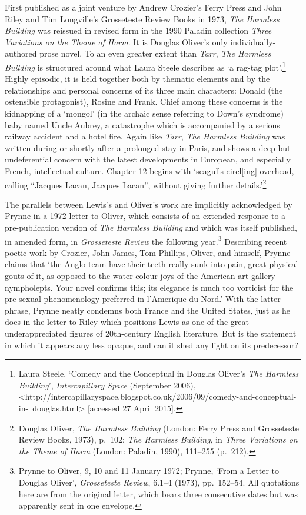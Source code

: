 \documentclass[]{article}
\begin{document}
First published as a joint venture by Andrew Crozier's Ferry Press and
John Riley and Tim Longville's Grosseteste Review Books in 1973,
\emph{The Harmless Building} was reissued in revised form in the 1990
Paladin collection \emph{Three Variations on the Theme of Harm}. It is
Douglas Oliver's only individually-authored prose novel. To an even
greater extent than \emph{Tarr}, \emph{The Harmless Building} is
structured around what Laura Steele describes as `a rag-tag
plot'.\footnote{Laura Steele, `Comedy and the Conceptual in Douglas
  Oliver's \emph{The Harmless Building}', \emph{Intercapillary Space}
  (September 2006),
  \textless{}http://intercapillaryspace.blogspot.co.uk/2006/09/comedy-and-conceptual-in-~douglas.html\textgreater{}
  {[}accessed 27 April 2015{]}.} Highly episodic, it is held together
both by thematic elements and by the relationships and personal concerns
of its three main characters: Donald (the ostensible protagonist),
Rosine and Frank. Chief among these concerns is the kidnapping of a
`mongol' (in the archaic sense referring to Down's syndrome) baby named
Uncle Aubrey, a catastrophe which is accompanied by a serious railway
accident and a hotel fire. Again like \emph{Tarr}, \emph{The Harmless
Building} was written during or shortly after a prolonged stay in Paris,
and shows a deep but undeferential concern with the latest developments
in European, and especially French, intellectual culture. Chapter 12
begins with `seagulls circl{[}ing{]} overhead, calling ``Jacques Lacan,
Jacques Lacan'', without giving further details.'\footnote{Douglas
  Oliver, \emph{The Harmless Building} (London: Ferry Press and
  Grosseteste Review Books, 1973), p.~102; \emph{The Harmless Building},
  in \emph{Three Variations on the Theme of Harm} (London: Paladin,
  1990), 111--255 (p.~212).}

The parallels between Lewis's and Oliver's work are implicitly
acknowledged by Prynne in a 1972 letter to Oliver, which consists of an
extended response to a pre-publication version of \emph{The Harmless
Building} and which was itself published, in amended form, in
\emph{Grosseteste Review} the following year.\footnote{Prynne to Oliver,
  9, 10 and 11 January 1972; Prynne, `From a Letter to Douglas Oliver',
  \emph{Grosseteste Review}, 6.1--4 (1973), pp.~152--54. All quotations
  here are from the original letter, which bears three consecutive dates
  but was apparently sent in one envelope.} Describing recent poetic
work by Crozier, John James, Tom Phillips, Oliver, and himself, Prynne
claims that `the Anglo team have their teeth really sunk into pain,
great physical gouts of it, as opposed to the water-colour joys of the
American art-gallery nympholepts. Your novel confirms this; its elegance
is much too vorticist for the pre-sexual phenomenology preferred in
l'Amerique du Nord.' With the latter phrase, Prynne neatly condemns both
France and the United States, just as he does in the letter to Riley
which positions Lewis as one of the great underappreciated figures of
20th-century English literature. But is the statement in which it
appears any less opaque, and can it shed any light on its predecessor?
\end{document}

